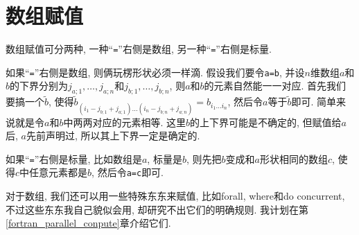 \section{数组赋值}\label{fortran_array_assignment}

数组赋值可分两种, 一种``\texttt{=}''右侧是数组, 另一种``\texttt{=}''右侧是标量.

如果``\texttt{=}''右侧是数组, 则俩玩楞形状必须一样滴. 假设我们要令\texttt{a=b}, 并设$n$维数组$a$和$b$的下界分别为$j_{a;1},\dots,j_{a;n}$和$j_{b;1},\dots,j_{b;n}$, 则$a$和$b$的元素自然能一一对应. 首先我们要搞一个$\tilde{b}$, 使得$\tilde{b}_{(i_1-j_{b;1}+j_{a;1})\dots(i_n-j_{b;n}+j_{a;n})}=b_{i_1\dots i_n}$, 然后令$a$等于$\tilde{b}$即可. 简单来说就是令$a$和$b$中两两对应的元素相等. 这里$b$的上下界可能是不确定的, 但赋值给$a$后, $a$先前声明过, 所以其上下界一定是确定的.

如果``\texttt{=}''右侧是标量, 比如数组是$a$, 标量是$b$, 则先把$b$变成和$a$形状相同的数组$c$, 使得$c$中任意元素都是$b$, 然后令\texttt{a=c}即可.

对于数组, 我们还可以用一些特殊东东来赋值, 比如forall, where和do concurrent, 不过这些东东我自己貌似会用, 却研究不出它们的明确规则. 我计划在第\ref{fortran_parallel_conpute}章介绍它们.
